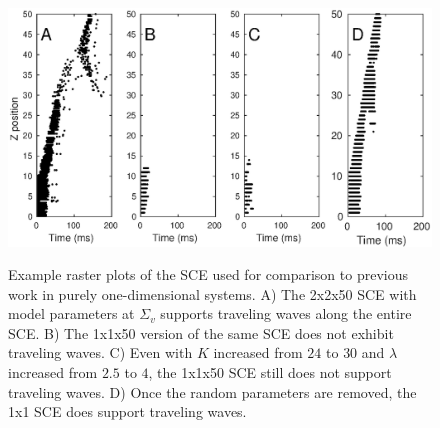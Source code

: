 \documentclass[12pt]{article}
\begin{document}
\begin{figure}[!htb]
 \caption{ Example raster plots of the SCE used for comparison to previous work in purely one-dimensional systems.
           A) The 2x2x50 SCE with model parameters at $\Sigma_v$ supports traveling waves along the entire SCE. 
	   B) The 1x1x50 version of the same SCE does not exhibit traveling waves.
	   C) Even with $K$ increased from $24$ to $30$ and $\lambda$ increased from $2.5$ to $4$, the 1x1x50 SCE still does not support traveling waves.
	   D) Once the random parameters are removed, the 1x1 SCE does support traveling waves. }
   \includegraphics[width=\textwidth]{fig/OneDimensionalComparison_RasterPlots}
   \label{fig:OneDimensionalRasterPlots}
\end{figure}
\FloatBarrier

\color{black}
\end{document}
